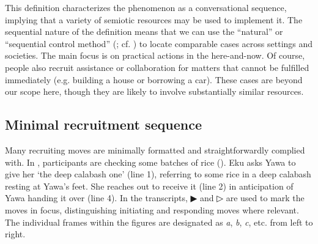 \documentclass[output=paper]{langsci/langscibook}
\begin{document}
This definition characterizes the phenomenon as a conversational sequence, implying that a variety of semiotic resources may be used to implement it. The sequential nature of the definition means that we can use the “natural”  or “sequential control method” (\citealt{dingemanse_conversation_2014}; cf. \citealt{zimmerman_horizontal_1999}) to locate comparable cases across settings and societies. The main focus is on practical actions in the here-and-now. Of course, people also recruit assistance or collaboration for matters that cannot be fulfilled immediately (e.g. building a house or borrowing a car). These cases are beyond our scope here, though they are likely to involve substantially similar resources.

\subsection{Minimal recruitment sequence}

Many recruiting moves are minimally formatted and straightforwardly complied with. In , participants are checking some batches of rice (). Eku asks Yawa to give her ‘the deep calabash one’ (line 1), referring to some rice in a deep calabash resting at Yawa’s feet. She reaches out to receive it (line 2) in anticipation of Yawa handing it over (line 4).  In the transcripts, ▶ and ▷ are used to mark the moves in focus, distinguishing initiating and responding moves where relevant. The individual frames within the figures are designated as \textit{a}, \textit{b}, \textit{c}, etc. from left to right.
\end{document}

